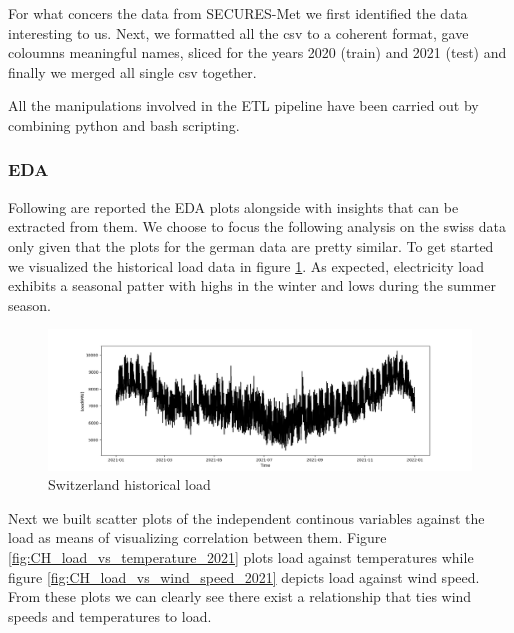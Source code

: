 For what concers the data from SECURES-Met we first identified the data interesting to us. Next, we formatted all the csv to a coherent format, gave coloumns meaningful names, sliced for the years 2020 (train) and 2021 (test) and finally we merged all single csv together.

All the manipulations involved in the ETL pipeline have been carried out by combining python and bash scripting. 

\subsubsection{EDA}
Following are reported the EDA plots alongside with insights that can be extracted from them. We choose to focus the following analysis on the swiss data only given that the plots for the german data are pretty similar.
To get started we visualized the historical load data in figure \ref{fig:CH_historical_load_2021}. As expected, electricity load exhibits a seasonal patter with highs in the winter and lows during the summer season.
\begin{figure}[!h]
    \includegraphics[width=\textwidth]{images/CH_historical_load_2021.png}
    \caption{Switzerland historical load}
    \label{fig:CH_historical_load_2021}
\end{figure}
Next we built scatter plots of the independent continous variables against the load as means of visualizing correlation between them.
Figure \ref{fig:CH_load_vs_temperature_2021} plots load against temperatures while figure \ref{fig:CH_load_vs_wind_speed_2021} depicts load against wind speed. From these plots we can clearly see there exist a relationship that ties wind speeds and temperatures to load.

